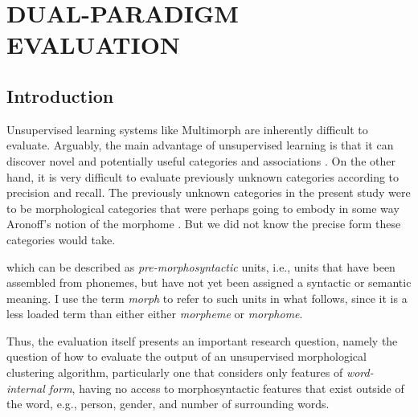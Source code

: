 \chapter{DUAL-PARADIGM EVALUATION}
\label{ch:eval}

\section{Introduction}

Unsupervised learning systems like Multimorph are inherently difficult to evaluate. 
Arguably, the main advantage of unsupervised learning is that it can discover novel and potentially useful categories and associations \citep{parsons:2004}. On the other hand, it is very difficult to evaluate previously unknown categories according to precision and recall. %
The previously unknown categories in the present study were to be morphological 
categories that were perhaps going to embody in some way Aronoff's notion of the morphome \citep{aronoff:1994}.  But we did not know the precise form these categories would take. 


which can be described as 
\emph{pre-morphosyntactic} units, i.e., units that have been assembled from 
phonemes, but have not yet been assigned 
a syntactic or semantic meaning. I use the term \emph{morph} to refer to such units in what follows, since it is a less loaded term than either
either \emph{morpheme} or \emph{morphome}.

Thus, the evaluation itself presents an important research question, namely the question 
of how to evaluate the output of an unsupervised morphological clustering algorithm, 
particularly one that considers only features of \emph{word-internal form}, having no 
access to morphosyntactic features that exist outside of the word, e.g., person, gender, and 
number of surrounding words.

